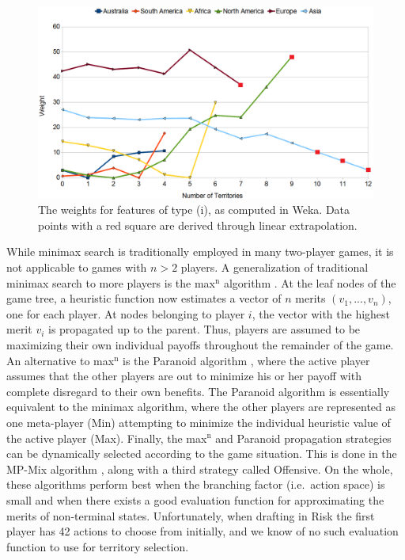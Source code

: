 \documentclass[letterpaper]{article}
\numberwithin{equation}{section}
\numberwithin{theorem}{section}
\numberwithin{lemma}{section}
\numberwithin{df}{section}
\begin{document}

\begin{figure}[t]
	\centering
	\includegraphics[scale=0.57]{TerritoryValues.png}
	\caption{The weights for features of type (i), as computed in Weka.  Data points with a red square are derived through linear extrapolation.}
	\label{fig:TerritoryValues}
\end{figure} 

While minimax search is traditionally employed in many two-player games, it is not applicable to games with $n > 2$ players.  A generalization of traditional minimax search to more players is the max$^\text{n}$ algorithm \cite{MaxN}.  At the leaf nodes of the game tree, a heuristic function now estimates a vector of $n$ merits $(v_1, ..., v_n)$, one for each player.  At nodes belonging to player $i$, the vector with the highest merit $v_i$ is propagated up to the parent.  Thus, players are assumed to be maximizing their own individual payoffs throughout the remainder of the game.  An alternative to max$^\text{n}$ is the Paranoid algorithm \cite{Paranoid}, where the active player assumes that the other players are out to minimize his or her payoff with complete disregard to their own benefits.  The Paranoid algorithm is essentially equivalent to the minimax algorithm, where the other players are represented as one meta-player (Min) attempting to minimize the individual heuristic value of the active player (Max).  Finally, the max$^\text{n}$ and Paranoid propagation strategies can be dynamically selected according to the game situation.  This is done in the MP-Mix algorithm \cite{ZuckFelnerKraus2009}, along with a third strategy called Offensive.  On the whole, these algorithms perform best when the branching factor (i.e.~action space) is small and when there exists a good evaluation function for approximating the merits of non-terminal states.  Unfortunately, when drafting in Risk the first player has 42 actions to choose from initially, and we know of no such evaluation function to use for territory selection.
\end{document}
